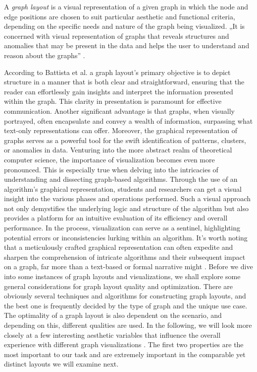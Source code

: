 \documentclass[bachelor, english]{algothesis}
\begin{document}
\begin{definition}
    A \emph{graph layout} is a visual representation of a given graph in which the node and edge positions are chosen to suit particular aesthetic and functional criteria, depending on the specific needs and nature of the graph being visualized. „It is concerned with visual representation of graphs that reveals structures and anomalies that may be present in the data and helps the user to understand and reason about the graphs” \cite{layot_definition}.
\end{definition}
\noindent
According to Battista et al. \cite{Visualization} a graph layout's primary objective is to depict structure in a manner that is both clear and straightforward, ensuring that the reader can effortlessly gain insights and interpret the information presented within the graph. This clarity in presentation is paramount for effective communication. Another significant advantage is that graphs, when visually portrayed, often encapsulate and convey a wealth of information, surpassing what text-only representations can offer. Moreover, the graphical representation of graphs serves as a powerful tool for the swift identification of patterns, clusters, or anomalies in data. 
\newline
Venturing into the more abstract realm of theoretical computer science, the importance of visualization becomes even more pronounced. This is especially true when delving into the intricacies of understanding and dissecting graph-based algorithms. Through the use of an algorithm's graphical representation, students and researchers can get a visual insight into the various phases and operations performed. Such a visual approach not only demystifies the underlying logic and structure of the algorithm but also provides a platform for an intuitive evaluation of its efficiency and overall performance. \newline
In the process, visualization can serve as a sentinel, highlighting potential errors or inconsistencies lurking within an algorithm. It's worth noting that a meticulously crafted graphical representation can often expedite and sharpen the comprehension of intricate algorithms and their subsequent impact on a graph, far more than a text-based or formal narrative might \cite{Visualization}. 
\newline
Before we dive into some instances of graph layouts and visualizations, we shall explore some general considerations for graph layout quality and optimization. There are obviously several techniques and algorithms for constructing graph layouts, and the best one is frequently decided by the type of graph and the unique use case. The optimality of a graph layout is also dependent on the scenario, and depending on this, different qualities are used. In the following, we will look more closely at a few interesting aesthetic variables that influence the overall experience with different graph visualizations \cite{aesthetic}. The first two properties are the most important to our task and are extremely important in the comparable yet distinct layouts we will examine next. 
\end{document}
